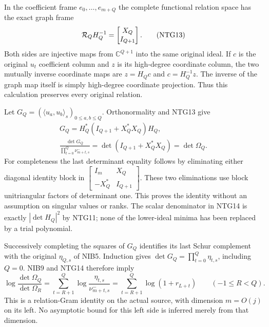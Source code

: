 \documentclass[11pt,a4paper]{article}
\begin{document}
In the coefficient frame $e_0,\ldots,e_{m+Q}$ the complete
functional relation space has the exact graph frame
\[
 {\cal R}_QH_Q^{-1}
     =\begin{bmatrix}X_Q\\I_{Q+1}\end{bmatrix}.
                                                               \tag{NTG13}
\]
Both sides are injective maps from $\mathbb C^{Q+1}$ into
the same original ideal. If $c$ is the original $u_t$
coefficient column and $z$ is its high-degree coordinate
column, the two mutually inverse coordinate maps are
$z=H_Qc$ and $c=H_Q^{-1}z$. The inverse of the graph
map itself is simply high-degree coordinate projection.
Thus this calculation preserves every original relation.

Let $G_Q=(\langle u_a,u_b\rangle_s)_{0\le a,b\le Q}$.
Orthonormality and NTG13 give
\[
\begin{gathered}
 G_Q=H_Q^*(I_{Q+1}+X_Q^*X_Q)H_Q,\\
 \frac{\det G_Q}{\prod_{t=0}^{Q}\nu_{m+t,s}^-}
       =\det(I_{Q+1}+X_Q^*X_Q)=\det\Omega_Q .
\end{gathered}                                                    \tag{NTG14}
\]
For completeness the last determinant equality follows by
eliminating either diagonal identity block in
$\left[\begin{smallmatrix}I_m&X_Q\\-X_Q^*&I_{Q+1}
\end{smallmatrix}\right]$. These two eliminations use block
unitriangular factors of determinant one. This proves the
identity without an assumption on singular values or ranks.
The scalar denominator in NTG14 is exactly
$|\det H_Q|^2$ by NTG11; none of the lower-ideal minima
has been replaced by a trial polynomial.

Successively completing the squares of $G_Q$ identifies its
last Schur complement with the original $\eta_{Q,s}$ of NIB5.
Induction gives $\det G_Q=\prod_{t=0}^Q\eta_{t,s}$, including
$Q=0$. NIB9 and NTG14 therefore imply
\[
 \log\frac{\det\Omega_Q}{\det\Omega_R}
   =\sum_{t=R+1}^{Q}\log\frac{\eta_{t,s}}{\nu_{m+t,s}^-}
   =\sum_{t=R+1}^{Q}\log(1+r_{L+t})
        \qquad(-1\le R<Q).
                                                               \tag{NTG15}
\]
This is a relation-Gram identity on the actual source, with
dimension $m=O(j)$ on its left. No asymptotic bound for this
left side is inferred merely from that dimension.
\end{document}
